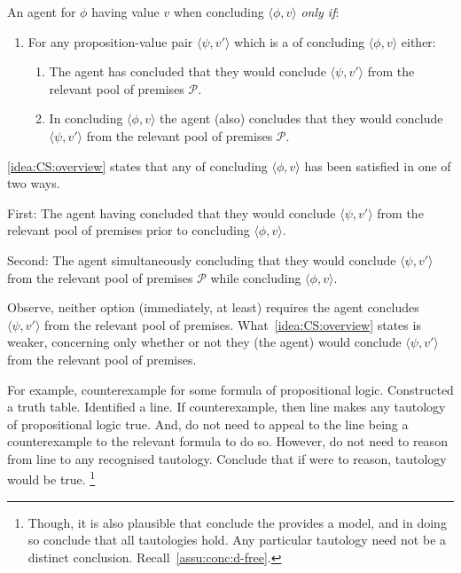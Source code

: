 \begin{note}
  \begin{idea}[\csN{2}]
    \label{idea:CS:overview}
    An agent \csV{} for \(\phi\) having value \(v\) when concluding \(\langle \phi,v \rangle\) \emph{only if}:
    \begin{enumerate}
    \item
      \label{idea:CS:overview:requ}
      For any proposition-value pair \(\langle \psi, v' \rangle\) which is a \requ{} of concluding \(\langle \phi,v \rangle\) either:
      \begin{enumerate}
      \item
        \label{idea:CS:overview:requ-sat:Past}
        The agent has concluded that they would conclude \(\langle \psi, v' \rangle\) from the relevant pool of premises \(\mathcal{P}\).
      \item
        \label{idea:CS:overview:requ-sat:Pres}
        In concluding \(\langle \phi,v \rangle\) the agent (also) concludes that they would conclude \(\langle \psi, v' \rangle\) from the relevant pool of premises \(\mathcal{P}\).
      \end{enumerate}
    \end{enumerate}
    \vspace{-\baselineskip}
  \end{idea}

  \autoref{idea:CS:overview} states that any \requ{} of concluding \(\langle \phi,v \rangle\) has been satisfied in one of two ways.

  First:
  The agent having concluded that they would conclude \(\langle \psi,v' \rangle\) from the relevant pool of premises prior to concluding \(\langle \phi,v \rangle\).

  Second:
  The agent simultaneously concluding that they would conclude \(\langle \psi, v' \rangle\) from the relevant pool of premises \(\mathcal{P}\) while concluding \(\langle \phi,v \rangle\).

  Observe, neither option (immediately, at least) requires the agent concludes \(\langle \psi,v' \rangle\) from the relevant pool of premises.
  What~\autoref{idea:CS:overview} states is weaker, concerning only whether or not they (the agent) would conclude \(\langle \psi,v' \rangle\) from the relevant pool of premises.

  For example, counterexample for some formula of propositional logic.
  Constructed a truth table.
  Identified a line.
  If counterexample, then line makes any tautology of propositional logic true.
  And, do not need to appeal to the line being a counterexample to the relevant formula to do so.
  However, do not need to reason from line to any recognised tautology.
  Conclude that if were to reason, tautology would be true.\nolinebreak
  \footnote{
    Though, it is also plausible that conclude the provides a model, and in doing so conclude that all tautologies hold.
    Any particular tautology need not be a distinct conclusion.
    Recall~\autoref{assu:conc:d-free}.
  }
\end{note}


